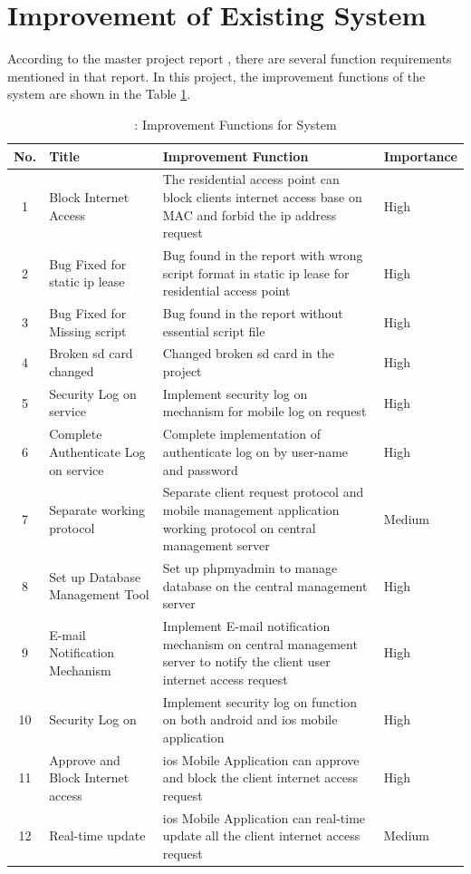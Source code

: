 \section{Improvement of Existing System}
\par According to the master project report \cite{TorgeirMR}, there are several function requirements mentioned in that report. In this project, the improvement functions of the system are shown in the Table \ref{tab:improve_system_func}.
\begin{table}
\caption{\label{tab:improve_system_func}: Improvement Functions for System}
\centering
\begin{tabular}{| c | p{4cm} | p{6cm} | l |}
\hline
 No. & Title & Improvement Function & Importance \\ \hline
 1 & Block Internet Access & The residential access point can block clients internet access base on MAC and forbid the \gls{ip} address request & High \\
 2 & Bug Fixed for static \gls{ip} lease & Bug found in the report with wrong script format in static \gls{ip} lease for residential access point & High \\
 3 & Bug Fixed for Missing script & Bug found in the report without essential script file & High \\
 4 & Broken \gls{sd} card changed & Changed broken \gls{sd} card in the project & High \\ \hline
 5 & Security Log on service & Implement security log on mechanism for mobile log on request & High \\
 6 & Complete Authenticate Log on service & Complete implementation of authenticate log on by user-name and password & High \\
 7 & Separate working protocol & Separate client request protocol and mobile management application working protocol on central management server & Medium \\
 8 & Set up Database Management Tool & Set up phpmyadmin\cite{phpmyadmin} to manage database on the central management server & High \\
 9 & E-mail Notification Mechanism & Implement E-mail notification mechanism on central management server to notify the client user internet access request & High \\ \hline
 10 & Security Log on & Implement security log on function on both android and \gls{ios} mobile application & High \\
 11 & Approve and Block Internet access & \gls{ios} Mobile Application can approve and block the client internet access request & High \\
 12 & Real-time update & \gls{ios} Mobile Application can real-time update all the client internet access request & Medium \\ \hline
\end{tabular} 
\end{table}

